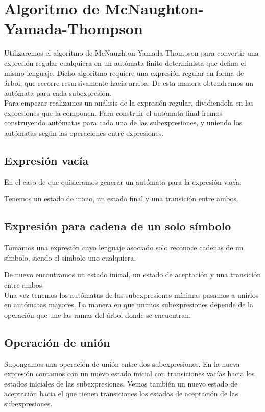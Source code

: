 
\section{Algoritmo de McNaughton-Yamada-Thompson}

Utilizaremos el algoritmo de McNaughton-Yamada-Thompson \cite{dragon} para convertir una expresión regular cualquiera en un autómata finito determinista que defina el mismo lenguaje.
Dicho algoritmo requiere una expresión regular en forma de árbol, que recorre resursivamente hacia arriba.
De esta manera obtendremos un autómata para cada subexpresión.
\\
Para empezar realizamos un análisis de la expresión regular, dividiendola en las expresiones que la componen.
Para construir el autómata final iremos construyendo autómatas para cada una de las subexpresiones, y uniendo los autómatas según las operaciones entre expresiones.

\subsection{Expresión vacía}
En el caso de que quisieramos generar un autómata para la expresión vacía:


Tenemos un estado de inicio, un estado final y una transición entre ambos.

\subsection{Expresión para cadena de un solo símbolo}
Tomamos una expresión cuyo lenguaje asociado solo reconoce cadenas de un símbolo, siendo el símbolo uno cualquiera.


De nuevo encontramos un estado inicial, un estado de aceptación y una transición entre ambos.
\\
Una vez tenemos los autómatas de las subexpresiones mínimas pasamos a unirlos en autómatas mayores.
La manera en que unimos subexpresiones depende de la operación que une las ramas del árbol donde se encuentran.

\subsection{Operación de unión}
Supongamos una operación de unión entre dos subexpresiones.
En la nueva expresión contamos con un nuevo estado inicial con transiciones vacías hacia los estados iniciales de las subexpresiones.
Vemos también un nuevo estado de aceptación hacia el que tienen transiciones los estados de aceptación de las subexpresiones.


